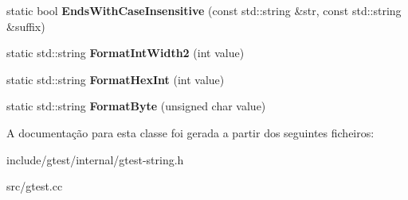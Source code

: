 \begin{DoxyCompactItemize}
\item 
\hypertarget{classtesting_1_1internal_1_1String_a968f242b709f8c7c0ed5ecf246553321}{static bool {\bfseries Ends\-With\-Case\-Insensitive} (const std\-::string \&str, const std\-::string \&suffix)}\label{classtesting_1_1internal_1_1String_a968f242b709f8c7c0ed5ecf246553321}

\item 
\hypertarget{classtesting_1_1internal_1_1String_af50b18d588355871e1982c4043523e0f}{static std\-::string {\bfseries Format\-Int\-Width2} (int value)}\label{classtesting_1_1internal_1_1String_af50b18d588355871e1982c4043523e0f}

\item 
\hypertarget{classtesting_1_1internal_1_1String_affe59102e49092fc0684388e9b0c5c1e}{static std\-::string {\bfseries Format\-Hex\-Int} (int value)}\label{classtesting_1_1internal_1_1String_affe59102e49092fc0684388e9b0c5c1e}

\item 
\hypertarget{classtesting_1_1internal_1_1String_af702dc7cbd569589d8e3ff215a7cafa9}{static std\-::string {\bfseries Format\-Byte} (unsigned char value)}\label{classtesting_1_1internal_1_1String_af702dc7cbd569589d8e3ff215a7cafa9}

\end{DoxyCompactItemize}


A documentação para esta classe foi gerada a partir dos seguintes ficheiros\-:\begin{DoxyCompactItemize}
\item 
include/gtest/internal/gtest-\/string.\-h\item 
src/gtest.\-cc\end{DoxyCompactItemize}
